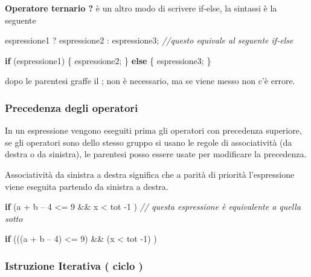 \documentclass[
  paper=a4,
  oneside  ,captions=tableheading
]{scrbook}
\newenvironment{Shaded}{}{}
\newcommand{\CommentTok}[1]{\textcolor[rgb]{0.38,0.63,0.69}{\textit{#1}}}
\newcommand{\ControlFlowTok}[1]{\textcolor[rgb]{0.00,0.44,0.13}{\textbf{#1}}}
\newcommand{\DecValTok}[1]{\textcolor[rgb]{0.25,0.63,0.44}{#1}}
\newcommand{\NormalTok}[1]{#1}
\begin{document}
\textbf{Operatore ternario ?} è un altro modo di scrivere if-else, la
sintassi è la seguente

\begin{Shaded}
\begin{Highlighting}[]
\NormalTok{espressione1 ? espressione2 : espressione3; }\CommentTok{//questo equivale al seguente if{-}else}

\ControlFlowTok{if}\NormalTok{ (espressione1)}
\NormalTok{    \{ espressione2; \}}
\ControlFlowTok{else}
\NormalTok{    \{ espressione3; \}}
\end{Highlighting}
\end{Shaded}

dopo le parentesi graffe il ; non è necessario, ma se viene messo non
c'è errore.

\hypertarget{precedenza-degli-operatori}{%
\subsubsection{Precedenza degli
operatori}\label{precedenza-degli-operatori}}

In un espressione vengono eseguiti prima gli operatori con precedenza
superiore, se gli operatori sono dello stesso gruppo si usano le regole
di associatività (da destra o da sinistra), le parentesi posso essere
usate per modificare la precedenza.

Associatività da sinistra a destra significa che a parità di priorità
l'espressione viene eseguita partendo da sinistra a destra.

\begin{Shaded}
\begin{Highlighting}[]
\ControlFlowTok{if}\NormalTok{ (a + b – }\DecValTok{4}\NormalTok{ \textless{}= }\DecValTok{9}\NormalTok{ \&\& x \textless{} tot {-}}\DecValTok{1}\NormalTok{ ) }\CommentTok{// questa espressione è equivalente a quella sotto}
    
\ControlFlowTok{if}\NormalTok{ (((a + b – }\DecValTok{4}\NormalTok{) \textless{}= }\DecValTok{9}\NormalTok{) \&\& (x \textless{} tot {-}}\DecValTok{1}\NormalTok{) )}
\end{Highlighting}
\end{Shaded}

\hypertarget{istruzione-iterativa-ciclo}{%
\subsubsection{Istruzione Iterativa ( ciclo
)}\label{istruzione-iterativa-ciclo}}
\end{document}
